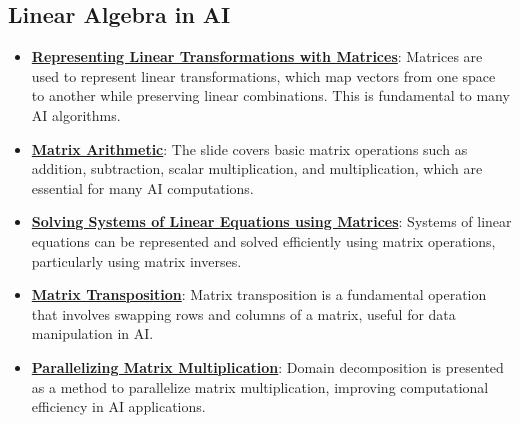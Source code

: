 \documentclass{article}%
\begin{document}
\subsection{Linear Algebra in AI}%
\label{subsec:LinearAlgebrainAI}%
\begin{itemize}[leftmargin=*]%
\item \href{\url{https://purdue.brightspace.com/d2l/common/assets/pdfjs-d2l-dist/1.0.14-legacy/web/viewer.html?file=\%252Fcontent\%252Fenforced\%252F1095467-wl.202510.CS.24300.001\%252F04L1-Linear\%20Algebra\%20Primer.pdf\%253Fou\%253D1095467\&lang=en-us\&container=d2l-fileviewer-rendered-pdf\&fullscreen=d2l-fileviewer-rendered-pdf-dialog\&height=667}#page=5}{\textbf{Representing Linear Transformations with Matrices}}: Matrices are used to represent linear transformations, which map vectors from one space to another while preserving linear combinations. This is fundamental to many AI algorithms.%
\item \href{\url{https://purdue.brightspace.com/d2l/common/assets/pdfjs-d2l-dist/1.0.14-legacy/web/viewer.html?file=\%252Fcontent\%252Fenforced\%252F1095467-wl.202510.CS.24300.001\%252F04L1-Linear\%20Algebra\%20Primer.pdf\%253Fou\%253D1095467\&lang=en-us\&container=d2l-fileviewer-rendered-pdf\&fullscreen=d2l-fileviewer-rendered-pdf-dialog\&height=667}#page=9}{\textbf{Matrix Arithmetic}}: The slide covers basic matrix operations such as addition, subtraction, scalar multiplication, and multiplication, which are essential for many AI computations.%
\item \href{\url{https://purdue.brightspace.com/d2l/common/assets/pdfjs-d2l-dist/1.0.14-legacy/web/viewer.html?file=\%252Fcontent\%252Fenforced\%252F1095467-wl.202510.CS.24300.001\%252F04L1-Linear\%20Algebra\%20Primer.pdf\%253Fou\%253D1095467\&lang=en-us\&container=d2l-fileviewer-rendered-pdf\&fullscreen=d2l-fileviewer-rendered-pdf-dialog\&height=667}#page=11}{\textbf{Solving Systems of Linear Equations using Matrices}}: Systems of linear equations can be represented and solved efficiently using matrix operations, particularly using matrix inverses.%
\item \href{\url{https://purdue.brightspace.com/d2l/common/assets/pdfjs-d2l-dist/1.0.14-legacy/web/viewer.html?file=\%252Fcontent\%252Fenforced\%252F1095467-wl.202510.CS.24300.001\%252F04L1-Linear\%20Algebra\%20Primer.pdf\%253Fou\%253D1095467\&lang=en-us\&container=d2l-fileviewer-rendered-pdf\&fullscreen=d2l-fileviewer-rendered-pdf-dialog\&height=667}#page=16}{\textbf{Matrix Transposition}}: Matrix transposition is a fundamental operation that involves swapping rows and columns of a matrix, useful for data manipulation in AI.%
\item \href{\url{https://purdue.brightspace.com/d2l/common/assets/pdfjs-d2l-dist/1.0.14-legacy/web/viewer.html?file=\%252Fcontent\%252Fenforced\%252F1095467-wl.202510.CS.24300.001\%252F04L1-Linear\%20Algebra\%20Primer.pdf\%253Fou\%253D1095467\&lang=en-us\&container=d2l-fileviewer-rendered-pdf\&fullscreen=d2l-fileviewer-rendered-pdf-dialog\&height=667}#page=18}{\textbf{Parallelizing Matrix Multiplication}}: Domain decomposition is presented as a method to parallelize matrix multiplication, improving computational efficiency in AI applications.%
\end{itemize}
\end{document}
